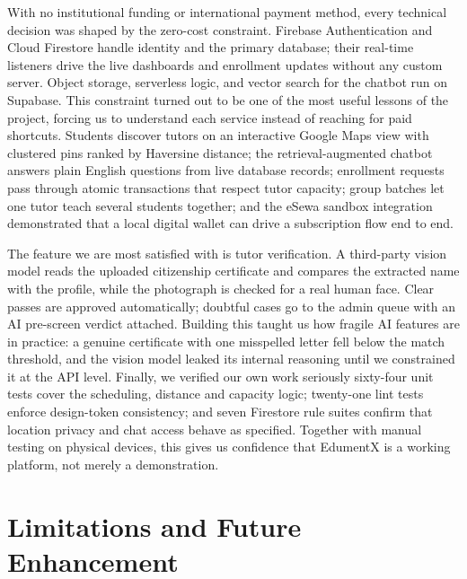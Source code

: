 \documentclass[12pt]{report}
\begin{document}
With no institutional funding or international payment method, every technical decision was shaped by the zero-cost constraint. Firebase Authentication and Cloud Firestore handle identity and the primary database; their real-time listeners drive the live dashboards and enrollment updates without any custom server. Object storage, serverless logic, and vector search for the chatbot run on Supabase. This constraint turned out to be one of the most useful lessons of the project, forcing us to understand each service instead of reaching for paid shortcuts. Students discover tutors on an interactive Google Maps view with clustered pins ranked by Haversine distance; the retrieval-augmented chatbot answers plain English questions from live database records; enrollment requests pass through atomic transactions that respect tutor capacity; group batches let one tutor teach several students together; and the eSewa sandbox integration demonstrated that a local digital wallet can drive a subscription flow end to end.

The feature we are most satisfied with is tutor verification. A third-party vision model reads the uploaded citizenship certificate and compares the extracted name with the profile, while the photograph is checked for a real human face. Clear passes are approved automatically; doubtful cases go to the admin queue with an AI pre-screen verdict attached. Building this taught us how fragile AI features are in practice: a genuine certificate with one misspelled letter fell below the match threshold, and the vision model leaked its internal reasoning until we constrained it at the API level. Finally, we verified our own work seriously sixty-four unit tests cover the scheduling, distance and capacity logic; twenty-one lint tests enforce design-token consistency; and seven Firestore rule suites confirm that location privacy and chat access behave as specified. Together with manual testing on physical devices, this gives us confidence that EdumentX is a working platform, not merely a demonstration.

\newpage
\chapter{Limitations and Future Enhancement}
\end{document}
